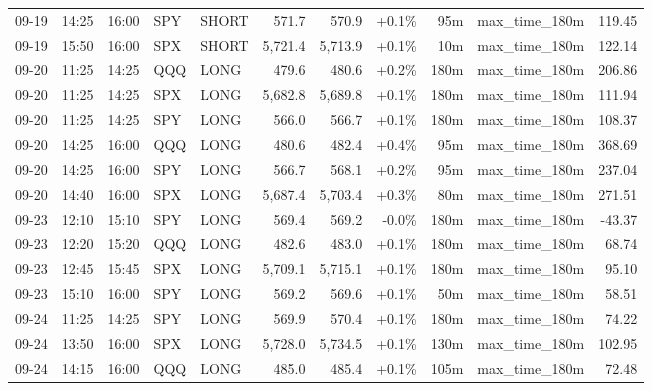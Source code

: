 \documentclass[11pt,a4paper,twoside]{article}
\begin{document}
\begin{center}
\begin{longtable}{>{\color{txtmain}}l l l l l r r r r >{\color{txtmain}}l r}
09-19 & 14:25 & 16:00 & SPY & SHORT & 571.7 & 570.9 & \textcolor{wingreen}{+0.1\%} & 95m & max\_time\_180m & \textcolor{wingreen}{119.45} \\
09-19 & 15:50 & 16:00 & SPX & SHORT & 5,721.4 & 5,713.9 & \textcolor{wingreen}{+0.1\%} & 10m & max\_time\_180m & \textcolor{wingreen}{122.14} \\
09-20 & 11:25 & 14:25 & QQQ & LONG & 479.6 & 480.6 & \textcolor{wingreen}{+0.2\%} & 180m & max\_time\_180m & \textcolor{wingreen}{206.86} \\
09-20 & 11:25 & 14:25 & SPX & LONG & 5,682.8 & 5,689.8 & \textcolor{wingreen}{+0.1\%} & 180m & max\_time\_180m & \textcolor{wingreen}{111.94} \\
09-20 & 11:25 & 14:25 & SPY & LONG & 566.0 & 566.7 & \textcolor{wingreen}{+0.1\%} & 180m & max\_time\_180m & \textcolor{wingreen}{108.37} \\
09-20 & 14:25 & 16:00 & QQQ & LONG & 480.6 & 482.4 & \textcolor{wingreen}{+0.4\%} & 95m & max\_time\_180m & \textcolor{wingreen}{368.69} \\
09-20 & 14:25 & 16:00 & SPY & LONG & 566.7 & 568.1 & \textcolor{wingreen}{+0.2\%} & 95m & max\_time\_180m & \textcolor{wingreen}{237.04} \\
09-20 & 14:40 & 16:00 & SPX & LONG & 5,687.4 & 5,703.4 & \textcolor{wingreen}{+0.3\%} & 80m & max\_time\_180m & \textcolor{wingreen}{271.51} \\
09-23 & 12:10 & 15:10 & SPY & LONG & 569.4 & 569.2 & \textcolor{lossred}{-0.0\%} & 180m & max\_time\_180m & \textcolor{lossred}{-43.37} \\
09-23 & 12:20 & 15:20 & QQQ & LONG & 482.6 & 483.0 & \textcolor{wingreen}{+0.1\%} & 180m & max\_time\_180m & \textcolor{wingreen}{68.74} \\
09-23 & 12:45 & 15:45 & SPX & LONG & 5,709.1 & 5,715.1 & \textcolor{wingreen}{+0.1\%} & 180m & max\_time\_180m & \textcolor{wingreen}{95.10} \\
09-23 & 15:10 & 16:00 & SPY & LONG & 569.2 & 569.6 & \textcolor{wingreen}{+0.1\%} & 50m & max\_time\_180m & \textcolor{wingreen}{58.51} \\
09-24 & 11:25 & 14:25 & SPY & LONG & 569.9 & 570.4 & \textcolor{wingreen}{+0.1\%} & 180m & max\_time\_180m & \textcolor{wingreen}{74.22} \\
09-24 & 13:50 & 16:00 & SPX & LONG & 5,728.0 & 5,734.5 & \textcolor{wingreen}{+0.1\%} & 130m & max\_time\_180m & \textcolor{wingreen}{102.95} \\
09-24 & 14:15 & 16:00 & QQQ & LONG & 485.0 & 485.4 & \textcolor{wingreen}{+0.1\%} & 105m & max\_time\_180m & \textcolor{wingreen}{72.48} \\

\end{longtable}
\end{center}
\end{document}
